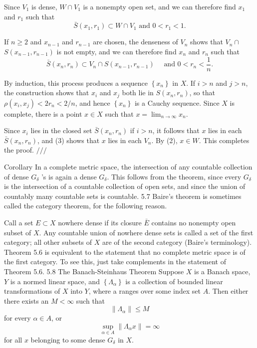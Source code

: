Since $V_1$ is dense, $W \cap V_1$ is a nonempty open set, and we can therefore find $x_1$ and $r_1$ such that
$$
\bar{S}\left(x_1, r_1\right) \subset W \cap V_1 \text { and } 0<r_1<1 .
$$

If $n \geq 2$ and $x_{n-1}$ and $r_{n-1}$ are chosen, the denseness of $V_n$ shows that $V_n \cap$ $S\left(x_{n-1}, r_{n-1}\right)$ is not empty, and we can therefore find $x_n$ and $r_n$ such that
$$
\bar{S}\left(x_n, r_n\right) \subset V_n \cap S\left(x_{n-1}, r_{n-1}\right) \quad \text { and } 0<r_n<\frac{1}{n} .
$$

By induction, this process produces a sequence $\left\{x_n\right\}$ in $X$. If $i>n$ and $j>n$, the construction shows that $x_i$ and $x_j$ both lie in $S\left(x_n, r_n\right)$, so that $\rho\left(x_i, x_j\right)<2 r_n<2 / n$, and hence $\left\{x_n\right\}$ is a Cauchy sequence. Since $X$ is complete, there is a point $x \in X$ such that $x=\lim _{n \rightarrow \infty} x_n$.

Since $x_i$ lies in the closed set $\bar{S}\left(x_n, r_n\right)$ if $i>n$, it follows that $x$ lies in each $\bar{S}\left(x_n, r_n\right)$, and (3) shows that $x$ lies in each $V_n$. By (2), $x \in W$. This completes the proof.
$/ / /$

Corollary In a complete metric space, the intersection of any countable collection of dense $G_\delta$ 's is again a dense $G_\delta$.
This follows from the theorem, since every $G_\delta$ is the intersection of a countable collection of open sets, and since the union of countably many countable sets is countable.
5.7 Baire's theorem is sometimes called the category theorem, for the following reason.

Call a set $E \subset X$ nowhere dense if its closure $\bar{E}$ contains no nonempty open subset of $X$. Any countable union of nowhere dense sets is called a set of the first category; all other subsets of $X$ are of the second category (Baire's terminology). Theorem 5.6 is equivalent to the statement that no complete metric space is of the first category. To see this, just take complements in the statement of Theorem 5.6.
5.8 The Banach-Steinhaus Theorem Suppose $X$ is a Banach space, $Y$ is a normed linear space, and $\left\{\Lambda_\alpha\right\}$ is a collection of bounded linear transformations of $X$ into $Y$, where a ranges over some index set $A$. Then either there exists an $M<\infty$ such that
$$
\left\|\Lambda_\alpha\right\| \leq M
$$
for every $\alpha \in A$, or
$$
\sup _{\alpha \in A}\left\|\Lambda_\alpha x\right\|=\infty
$$
for all $x$ belonging to some dense $G_\delta$ in $X$.

